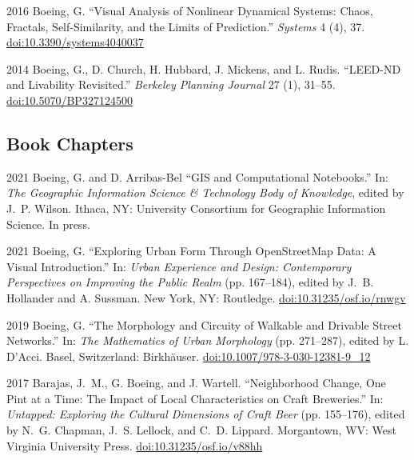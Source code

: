 \documentclass[12pt,letterpaper]{report}
\begin{document}
\begin{tablist}
        \item[2016] \tab Boeing, G. \enquote{Visual Analysis of Nonlinear Dynamical Systems: Chaos, Fractals, Self-Similarity, and the Limits of Prediction.} \textit{Systems} 4 (4), 37. \href{https://doi.org/10.3390/systems4040037}{doi:10.3390/systems4040037}

        \item[2014] \tab Boeing, G., D. Church, H. Hubbard, J. Mickens, and L. Rudis. \enquote{LEED-ND and Livability Revisited.} \textit{Berkeley Planning Journal} 27 (1), 31--55. \href{https://doi.org/10.5070/BP327124500}{doi:10.5070/BP327124500}

    \end{tablist}



    \subsection*{Book Chapters}

    \begin{tablist}

        \item[2021] \tab Boeing, G. and D. Arribas-Bel \enquote{GIS and Computational Notebooks.} In: \textit{The Geographic Information Science \& Technology Body of Knowledge}, edited by J.~P. Wilson. Ithaca, NY: University Consortium for Geographic Information Science. In press.

        \item[2021] \tab Boeing, G. \enquote{Exploring Urban Form Through OpenStreetMap Data: A Visual Introduction.} In: \textit{Urban Experience and Design: Contemporary Perspectives on Improving the Public Realm} (pp. 167--184), edited by J.~B. Hollander and A. Sussman. New York, NY: Routledge. \href{https://doi.org/10.31235/osf.io/rnwgv}{doi:10.31235/osf.io/rnwgv}

        \item[2019] \tab Boeing, G. \enquote{The Morphology and Circuity of Walkable and Drivable Street Networks.} In: \textit{The Mathematics of Urban Morphology} (pp. 271--287), edited by L. D'Acci. Basel, Switzerland: Birkhäuser. \href{https://doi.org/10.1007/978-3-030-12381-9_12}{doi:10.1007/978-3-030-12381-9\_12}

        \item[2017] \tab Barajas, J.~M., G. Boeing, and J. Wartell. \enquote{Neighborhood Change, One Pint at a Time: The Impact of Local Characteristics on Craft Breweries.} In: \textit{Untapped: Exploring the Cultural Dimensions of Craft Beer} (pp. 155--176), edited by N.~G. Chapman, J.~S. Lellock, and C.~D. Lippard. Morgantown, WV: West Virginia University Press. \href{https://doi.org/10.31235/osf.io/v88hh}{doi:10.31235/osf.io/v88hh}

    \end{tablist}
\end{document}

